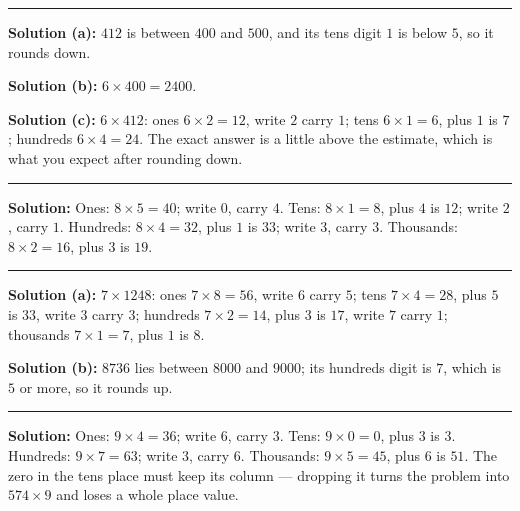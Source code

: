 \documentclass[12pt]{article}
\begin{document}
\vspace{0.12cm}\noindent\rule{\linewidth}{0.2pt}


\textbf{Solution (a):} $412$ is between $400$ and $500$, and its tens digit $1$ is below $5$, so it
rounds down. 

\textbf{Solution (b):} $6 \times 400 = 2400$. 

\textbf{Solution (c):} $6 \times 412$: ones $6 \times 2 = 12$, write $2$ carry $1$; tens
$6 \times 1 = 6$, plus $1$ is $7$; hundreds $6 \times 4 = 24$. The exact answer is a little above the
estimate, which is what you expect after rounding down. 

\vspace{0.12cm}\noindent\rule{\linewidth}{0.2pt}


\textbf{Solution:} Ones: $8 \times 5 = 40$; write $0$, carry $4$. Tens: $8 \times 1 = 8$, plus $4$ is
$12$; write $2$, carry $1$. Hundreds: $8 \times 4 = 32$, plus $1$ is $33$; write $3$, carry $3$.
Thousands: $8 \times 2 = 16$, plus $3$ is $19$. 

\vspace{0.12cm}\noindent\rule{\linewidth}{0.2pt}


\textbf{Solution (a):} $7 \times 1248$: ones $7 \times 8 = 56$, write $6$ carry $5$; tens
$7 \times 4 = 28$, plus $5$ is $33$, write $3$ carry $3$; hundreds $7 \times 2 = 14$, plus $3$ is
$17$, write $7$ carry $1$; thousands $7 \times 1 = 7$, plus $1$ is $8$. 

\textbf{Solution (b):} $8736$ lies between $8000$ and $9000$; its hundreds digit is $7$, which is $5$
or more, so it rounds up. 

\vspace{0.12cm}\noindent\rule{\linewidth}{0.2pt}


\textbf{Solution:} Ones: $9 \times 4 = 36$; write $6$, carry $3$. Tens: $9 \times 0 = 0$, plus $3$ is
$3$. Hundreds: $9 \times 7 = 63$; write $3$, carry $6$. Thousands: $9 \times 5 = 45$, plus $6$ is
$51$. The zero in the tens place must keep its column --- dropping it turns the problem into
$574 \times 9$ and loses a whole place value. 
\end{document}
